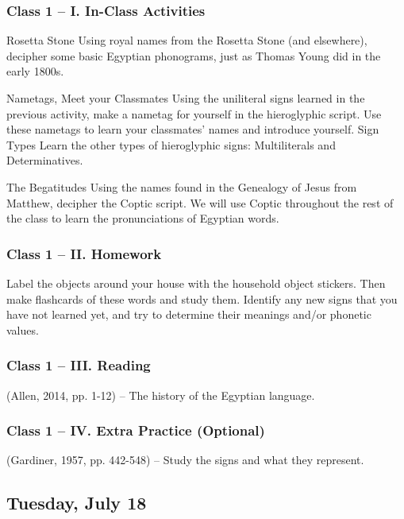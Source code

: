 \documentclass[11pt]{article}
\begin{document}
		\subsubsection*{Class 1 -- I. In-Class Activities}
			\begin{outline}[itemize]
				\1 Rosetta Stone
					\2 Using royal names from the Rosetta Stone (and elsewhere), 
						decipher some basic Egyptian phonograms, 
						just as Thomas Young did in the early 1800s.
				
				\1 Nametags, Meet your Classmates
					\2 Using the uniliteral signs learned in the previous activity, make a nametag for yourself in the hieroglyphic script.
						Use these nametags to learn your classmates' names and introduce yourself.
				\1 Sign Types
					\2 Learn the other types of hieroglyphic signs: Multiliterals and Determinatives.

				\1 The Begatitudes
					\2 Using the names found in the Genealogy of Jesus from Matthew, decipher the Coptic script.
						We will use Coptic throughout the rest of the class to learn the pronunciations of Egyptian words.
						
			\end{outline}
			
		\subsubsection*{Class 1 -- II. Homework}
			Label the objects around your house with the household object stickers.
			Then make flashcards of these words and study them.
			Identify any new signs that you have not learned yet, and try to determine their meanings and/or phonetic values.
			
		\subsubsection*{Class 1 -- III. Reading}
			(Allen, 2014, pp. 1-12) -- The history of the Egyptian language.
			
		\subsubsection*{Class 1 -- IV. Extra Practice (Optional)}
			(Gardiner, 1957, pp. 442-548) -- Study the signs and what they represent.
			
	\subsection*{Tuesday, July 18}
\end{document}

